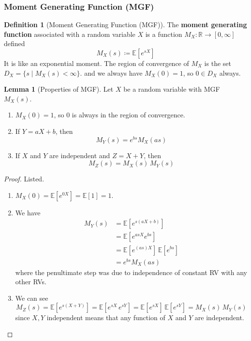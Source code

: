 \documentclass{article}
\theoremstyle{definition}
\newtheorem{lemma}[theorem]{Lemma}
\theoremstyle{remark}
\theoremstyle{definition}
\newtheorem{definition}{Definition}[section]
\begin{document}
\subsubsection{Moment Generating Function (MGF)}

\begin{definition}[Moment Generating Function (MGF)]
The \textbf{moment generating function} associated with a random variable $X$ is a function $M_X: \mathbb{R} \longrightarrow [0, \infty]$ defined 
\[M_X (s) \coloneqq \mathbb{E}[e^{s X}] \]
It is like an exponential moment. The region of convergence of $M_X$ is the set $D_X = \{s \mid M_X (s) < \infty\}$. 
and we always have $M_X (0) = 1$, so $0 \in D_X$ always. 
\end{definition}

\begin{lemma}[Properties of MGF]
Let $X$ be a random variable with MGF $M_X (s)$. 
\begin{enumerate}
    \item $M_X (0) = 1$, so $0$ is always in the region of convergence. 
    \item If $Y = a X + b$, then 
    \[M_Y (s) = e^{b s} M_X (a s)\]
    \item If $X$ and $Y$ are independent and $Z = X + Y$, then 
    \[M_Z (s) = M_X (s) \, M_Y (s)\]
\end{enumerate}
\end{lemma}
\begin{proof}
Listed. 
\begin{enumerate}
    \item $M_X (0) = \mathbb{E}[e^{0 X}] = \mathbb{E}[1] = 1$. 
    \item We have 
    \begin{align*}
        M_Y (s) & = \mathbb{E} [e^{s(a X + b)}] \\
        & = \mathbb{E}[ e^{a s X } e^{b s}] \\
        & = \mathbb{E}[e^{(as) X}] \, \mathbb{E}[e^{b s}] \\
        & = e^{b s} M_X (a s)
    \end{align*}
    where the penultimate step was due to independence of constant RV with any other RVs. 
    \item We can see 
    \[M_Z (s) = \mathbb{E}[ e^{s (X + Y)}] = \mathbb{E}[e^{s X} \, e^{s Y}] = \mathbb{E}[e^{s X}] \, \mathbb{E}[e^{s Y}] = M_X (s) \, M_Y (s)\]
    since $X, Y$ independent means that any function of $X$ and $Y$ are independent. 
\end{enumerate}
\end{proof}
\end{document}
